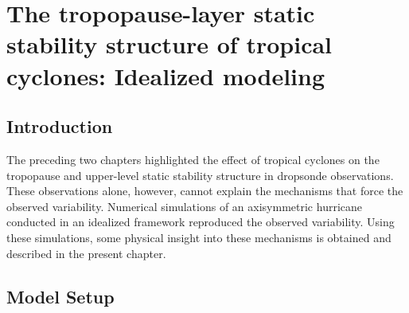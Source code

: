  
\chapter{The tropopause-layer static stability structure of tropical cyclones: Idealized modeling}
\resetfootnote %

\section{Introduction}

The preceding two chapters highlighted the effect of tropical cyclones on the tropopause and upper-level static stability structure in dropsonde observations.
These observations alone, however, cannot explain the mechanisms that force the observed variability.
Numerical simulations of an axisymmetric hurricane conducted in an idealized framework reproduced the observed variability.
Using these simulations, some physical insight into these mechanisms is obtained and described in the present chapter.

\section{Model Setup}

